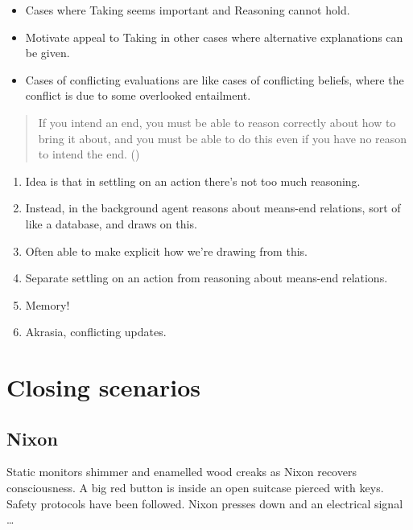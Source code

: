 \documentclass[10pt]{article}
\newcommand{\hand}{\ding{43}}
\newcommand{\hozlinedash}[0]{%
  \noindent\hdashrule[0.5ex][c]{\textwidth}{.1pt}{2.5pt}
}
\newcommand{\schemaName}[1]{\textsf{#1}}
\begin{document}
\begin{itemize}
\item[\hand] Cases where \schemaName{Taking} seems important and \schemaName{Reasoning} cannot hold.
\item Motivate appeal to \schemaName{Taking} in other cases where alternative explanations can be given.
\end{itemize}

\begin{itemize}
\item Cases of conflicting evaluations are like cases of conflicting beliefs, where the conflict is due to some overlooked entailment.
\end{itemize}



\begin{quote}
  If you intend an end, you must be able to reason correctly about how to bring it about, and you must be able to do this even if you have no reason to intend the end.\nolinebreak
  \mbox{}\hfill\mbox{(\citeyear[96]{Broome:2002aa})}
\end{quote}

\hozlinedash

\begin{enumerate}
\item Idea is that in settling on an action there's not too much reasoning.
\item Instead, in the background agent reasons about means-end relations, sort of like a database, and draws on this.
\item Often able to make explicit how we're drawing from this.
\item Separate settling on an action from reasoning about means-end relations.
\item Memory!
\item Akrasia, conflicting updates.
\end{enumerate}

\newpage

\section{Closing scenarios}
\label{sec:closing-scenarios}

\subsection{Nixon}
\label{sec:nixon}

\begin{scenario}[Nixon]
  Static monitors shimmer and enamelled wood creaks as Nixon recovers consciousness.
  A big red button is inside an open suitcase pierced with keys.
  Safety protocols have been followed.
  Nixon presses down and an electrical signal \dots
\end{scenario}
\end{document}
